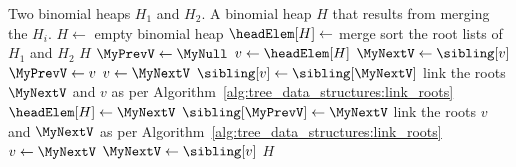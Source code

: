 
\begin{algorithmic}[1]
\Require Two binomial heaps $H_1$ and $H_2$.
\Ensure A binomial heap $H$ that results from merging the $H_i$.
\State $H \gets$ empty binomial heap
\State $\headElem[H] \gets$ merge sort the root lists of $H_1$ and $H_2$
\If{\rm $\headElem[H] = \MyNull$}
  \State \Return $H$
\EndIf
\State $\MyPrevV \gets \MyNull$
\State $v \gets \headElem[H]$
\State $\MyNextV \gets \sibling[v]$
\While{\rm $\MyNextV \neq \MyNull$}
    \State $\MyPrevV \gets v$
    \State $v \gets \MyNextV$
    \State $\sibling[v] \gets \sibling[\MyNextV]$
    \State link the roots $\MyNextV$ and $v$ as per Algorithm~\ref{alg:tree_data_structures:link_roots}
  \Else
    \If{\rm $\MyPrevV = \MyNull$}
      \State $\headElem[H] \gets \MyNextV$
    \Else
      \State $\sibling[\MyPrevV] \gets \MyNextV$
    \EndIf
    \State link the roots $v$ and $\MyNextV$ as per Algorithm~\ref{alg:tree_data_structures:link_roots}
    \State $v \gets \MyNextV$
  \EndIf
  \State $\MyNextV \gets \sibling[v]$
\EndWhile
\State \Return $H$
\end{algorithmic}
